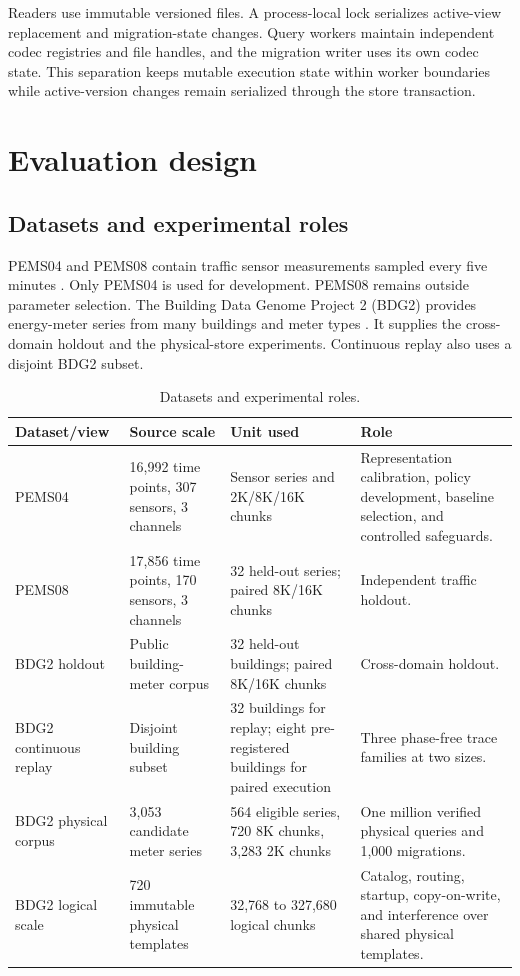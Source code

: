 \documentclass[final,5p,times,twocolumn,authoryear]{elsarticle}
\begin{document}
Readers use immutable versioned files. A process-local lock serializes active-view replacement and migration-state changes. Query workers maintain independent codec registries and file handles, and the migration writer uses its own codec state. This separation keeps mutable execution state within worker boundaries while active-version changes remain serialized through the store transaction.

\section{Evaluation design}
\label{sec:evaluation_design}

\subsection{Datasets and experimental roles}

PEMS04 and PEMS08 contain traffic sensor measurements sampled every five minutes \citep{song2020stsgcn}. Only PEMS04 is used for development. PEMS08 remains outside parameter selection. The Building Data Genome Project 2 (BDG2) provides energy-meter series from many buildings and meter types \citep{miller2020bdg2}. It supplies the cross-domain holdout and the physical-store experiments. Continuous replay also uses a disjoint BDG2 subset.

\begin{table}[t]
\centering
\caption{Datasets and experimental roles.}
\label{tab:datasets}
\begin{tabularx}{\textwidth}{@{}p{}p{}p{}X@{}}
\toprule
Dataset/view & Source scale & Unit used & Role \\
\midrule
PEMS04 & 16,992 time points, 307 sensors, 3 channels & Sensor series and 2K/8K/16K chunks & Representation calibration, policy development, baseline selection, and controlled safeguards. \\
PEMS08 & 17,856 time points, 170 sensors, 3 channels & 32 held-out series; paired 8K/16K chunks & Independent traffic holdout. \\
BDG2 holdout & Public building-meter corpus & 32 held-out buildings; paired 8K/16K chunks & Cross-domain holdout. \\
BDG2 continuous replay & Disjoint building subset & 32 buildings for replay; eight pre-registered buildings for paired execution & Three phase-free trace families at two sizes. \\
BDG2 physical corpus & 3,053 candidate meter series & 564 eligible series, 720 8K chunks, 3,283 2K chunks & One million verified physical queries and 1,000 migrations. \\
BDG2 logical scale & 720 immutable physical templates & 32,768 to 327,680 logical chunks & Catalog, routing, startup, copy-on-write, and interference over shared physical templates. \\
\bottomrule
\end{tabularx}
\end{table}
\end{document}
